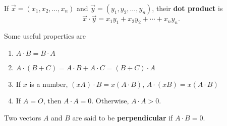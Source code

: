 \documentclass{article}
\begin{document}
If $\vec{x} = (x_1,x_2, \ldots, x_n)$ and $\vec{y} = (y_1, y_2, \ldots, y_n)$,
their \textbf{dot product} is 
\[\vec{x} \cdot \vec{y} = x_1 y_1 + x_2 y_2 + \cdots + x_n y_n.\]

Some useful properties are

\begin{enumerate}
    \item $A \cdot B = B \cdot A$
    \item $A \cdot (B + C) = A \cdot B + A \cdot C = (B+C) \cdot A$
    \item If $x$ is a number, $(xA) \cdot B = x(A \cdot B)$, $A \cdot (xB) = x(A \cdot B)$
    \item If $A=O$, then $A \cdot A = 0$. Otherwise, $A \cdot A > 0$.
\end{enumerate}

Two vectors $A$ and $B$ are said to be \textbf{perpendicular} if
$A \cdot B = 0$.




\end{document}
